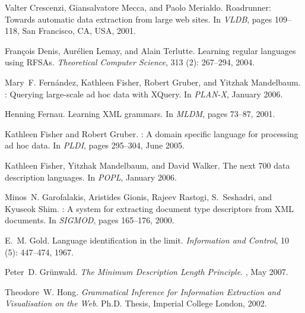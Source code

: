 \documentclass[natbib]{sigplanconf}
\begin{document}
\begin{thebibliography}{37}
Valter Crescenzi, Giansalvatore Mecca, and Paolo Merialdo.
\newblock Roadrunner: Towards automatic data extraction from large web sites.
\newblock In \emph{{VLDB}}, pages 109--118, San Francisco, CA, USA, 2001.

Fran\c{c}ois Denis, Aur{\'e}lien Lemay, and Alain Terlutte.
\newblock Learning regular languages using {RFSAs}.
\newblock \emph{Theoretical Computer Science}, 313 (2):
  267--294, 2004.

Mary~F. Fern\'andez, Kathleen Fisher, Robert Gruber, and Yitzhak Mandelbaum.
: Querying large-scale ad hoc data with {XQuery}.
\newblock In \emph{{PLAN-X}}, January 2006.

Henning Fernau.
\newblock Learning {XML} grammars.
\newblock In \emph{{MLDM}}, pages 73--87, 2001.

Kathleen Fisher and Robert Gruber.
: A domain specific language for processing ad hoc data.
\newblock In \emph{{PLDI}}, pages 295--304, June 2005.

Kathleen Fisher, Yitzhak Mandelbaum, and David Walker.
\newblock The next 700 data description languages.
\newblock In \emph{{POPL}}, January 2006.

Minos~N. Garofalakis, Aristides Gionis, Rajeev Rastogi, S.~Seshadri, and
  Kyuseok Shim.
: A system for extracting document type descriptors from
  {XML} documents.
\newblock In \emph{{SIGMOD}}, pages 165--176, 2000.

E.~M. Gold.
\newblock Language identification in the limit.
\newblock \emph{Information and Control}, 10 (5): 447--474,
  1967.

Peter~D. Gr\"{u}nwald.
\newblock \emph{The Minimum Description Length Principle}.
, May 2007.

Theodore~W. Hong.
\newblock \emph{Grammatical Inference for Information Extraction and
  Visualisation on the Web}.
\newblock Ph.D. Thesis, Imperial College London, 2002.


\end{thebibliography}
\end{document}
